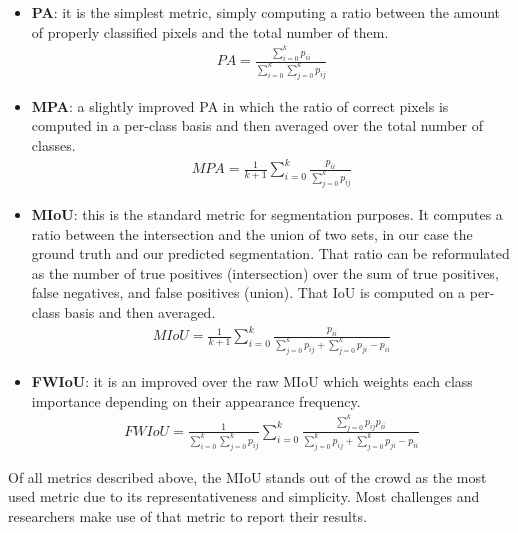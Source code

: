\begin{itemize}
	\item \textbf{\ac{PA}}: it is the simplest metric, simply computing a ratio between the amount of properly classified pixels and the total number of them.
		\begin{align*}
			PA = \displaystyle\frac{\displaystyle\sum_{i=0}^k p_{ii}}{\displaystyle\sum_{i=0}^k\displaystyle\sum_{j=0}^k p_{ij}}
		\end{align*}
	\item \textbf{\ac{MPA}}: a slightly improved \ac{PA} in which the ratio of correct pixels is computed in a per-class basis and then averaged over the total number of classes.
		\begin{align*}
			MPA = \displaystyle\frac{1}{k+1}\displaystyle\sum_{i=0}^k \displaystyle\frac{p_{ii}}{\displaystyle\sum_{j=0}^k p_{ij}}
		\end{align*}
	\item \textbf{\ac{MIoU}}: this is the standard metric for segmentation purposes. It computes a ratio between the intersection and the union of two sets, in our case the ground truth and our predicted segmentation. That ratio can be reformulated as the number of true positives (intersection) over the sum of true positives, false negatives, and false positives (union). That \ac{IoU} is computed on a per-class basis and then averaged.
		\begin{align*}
			MIoU = \displaystyle\frac{1}{k+1}\displaystyle\sum_{i=0}^k \displaystyle\frac{p_{ii}}{\displaystyle\sum_{j=0}^k p_{ij} + \displaystyle\sum_{j=0}^k p_{ji} - p_{ii}}
		\end{align*}
	\item \textbf{\ac{FWIoU}}: it is an improved over the raw \ac{MIoU} which weights each class importance depending on their appearance frequency.
		\begin{align*}
			FWIoU = \displaystyle\frac{1}{\displaystyle\sum_{i=0}^k \displaystyle\sum_{j=0}^k p_{ij}} \displaystyle\sum_{i=0}^k \displaystyle\frac{\displaystyle\sum_{j=0}^k p_{ij} p_{ii}}{\displaystyle\sum_{j=0}^k p_{ij} + \displaystyle\sum_{j=0}^k p_{ji} - p_{ii}}
		\end{align*}
\end{itemize}

Of all metrics described above, the \ac{MIoU} stands out of the crowd as the most used metric due to its representativeness and simplicity. Most challenges and researchers make use of that metric to report their results.

